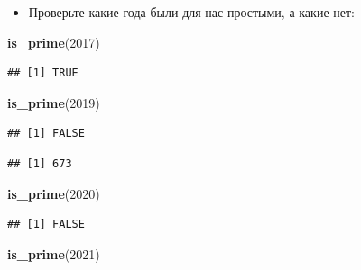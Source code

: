 \documentclass[]{book}
\newenvironment{Shaded}{\begin{snugshade}}{\end{snugshade}}
\newcommand{\KeywordTok}[1]{\textcolor[rgb]{0.13,0.29,0.53}{\textbf{#1}}}
\newcommand{\DecValTok}[1]{\textcolor[rgb]{0.00,0.00,0.81}{#1}}
\newcommand{\CommentTok}[1]{\textcolor[rgb]{0.56,0.35,0.01}{\textit{#1}}}
\newcommand{\OperatorTok}[1]{\textcolor[rgb]{0.81,0.36,0.00}{\textbf{#1}}}
\newcommand{\NormalTok}[1]{#1}
\providecommand{\tightlist}{%
  \setlength{\itemsep}{0pt}\setlength{\parskip}{0pt}}
\begin{document}
\begin{itemize}
\tightlist
\item
  Проверьте какие года были для нас простыми, а какие нет:
\end{itemize}

\begin{Shaded}
\begin{Highlighting}[]
\KeywordTok{is_prime}\NormalTok{(}\DecValTok{2017}\NormalTok{)}
\end{Highlighting}
\end{Shaded}

\begin{verbatim}
## [1] TRUE
\end{verbatim}

\begin{Shaded}
\begin{Highlighting}[]
\KeywordTok{is_prime}\NormalTok{(}\DecValTok{2019}\NormalTok{)}
\end{Highlighting}
\end{Shaded}

\begin{verbatim}
## [1] FALSE
\end{verbatim}

\begin{Shaded}
\end{Shaded}

\begin{verbatim}
## [1] 673
\end{verbatim}

\begin{Shaded}
\begin{Highlighting}[]
\KeywordTok{is_prime}\NormalTok{(}\DecValTok{2020}\NormalTok{)}
\end{Highlighting}
\end{Shaded}

\begin{verbatim}
## [1] FALSE
\end{verbatim}

\begin{Shaded}
\begin{Highlighting}[]
\KeywordTok{is_prime}\NormalTok{(}\DecValTok{2021}\NormalTok{)}
\end{Highlighting}
\end{Shaded}
\end{document}
